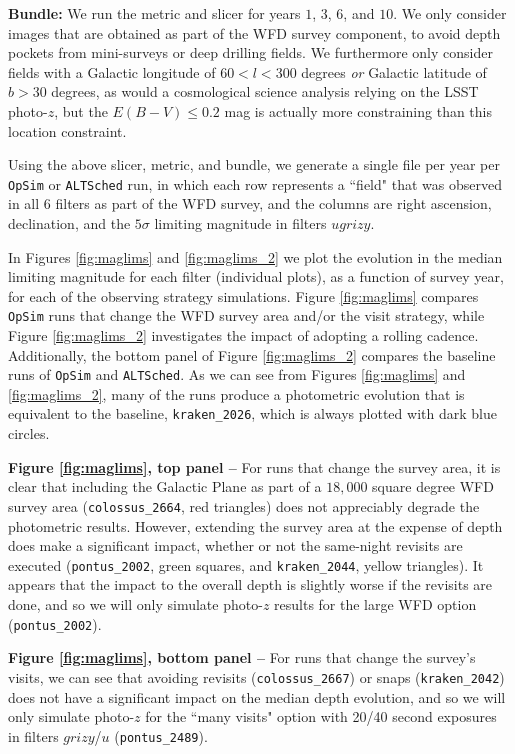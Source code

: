 {\bf Bundle:} We run the metric and slicer for years $1$, $3$, $6$, and $10$. We only consider images that are obtained as part of the WFD survey component, to avoid depth pockets from mini-surveys or deep drilling fields. We furthermore only consider fields with a Galactic longitude of $60 < l < 300$ degrees {\em or} Galactic latitude of $b>30$ degrees, as would a cosmological science analysis relying on the LSST photo-$z$, but the $E(B-V) \leq 0.2$ mag is actually more constraining than this location constraint.

Using the above slicer, metric, and bundle, we generate a single file per year per {\tt OpSim} or {\tt ALTSched} run, in which each row represents a ``field" that was observed in all $6$ filters as part of the WFD survey, and the columns are right ascension, declination, and the $5{\sigma}$ limiting magnitude in filters $ugrizy$. 

In Figures \ref{fig:maglims} and \ref{fig:maglims_2} we plot the evolution in the median limiting magnitude for each filter (individual plots), as a function of survey year, for each of the observing strategy simulations. Figure \ref{fig:maglims} compares {\tt OpSim} runs that change the WFD survey area and/or the visit strategy, while Figure \ref{fig:maglims_2} investigates the impact of adopting a rolling cadence. Additionally, the bottom panel of Figure \ref{fig:maglims_2} compares the baseline runs of {\tt OpSim} and {\tt ALTSched}. As we can see from Figures \ref{fig:maglims} and \ref{fig:maglims_2}, many of the runs produce a photometric evolution that is equivalent to the baseline, {\tt kraken\_2026}, which is always plotted with dark blue circles. 

{\bf Figure \ref{fig:maglims}, top panel --} For runs that change the survey area, it is clear that including the Galactic Plane as part of a $18,000$ square degree WFD survey area ({\tt colossus\_2664}, red triangles) does not appreciably degrade the photometric results. However, extending the survey area at the expense of depth does make a significant impact, whether or not the same-night revisits are executed ({\tt pontus\_2002}, green squares, and {\tt kraken\_2044}, yellow triangles). It appears that the impact to the overall depth is slightly worse if the revisits are done, and so we will only simulate photo-$z$ results for the large WFD option ({\tt pontus\_2002}). 

{\bf Figure \ref{fig:maglims}, bottom panel --} For runs that change the survey's visits, we can see that avoiding revisits ({\tt colossus\_2667}) or snaps ({\tt kraken\_2042}) does not have a significant impact on the median depth evolution, and so we will only simulate photo-$z$ for the ``many visits" option with 20/40 second exposures in filters $grizy$/$u$ ({\tt pontus\_2489}). 

